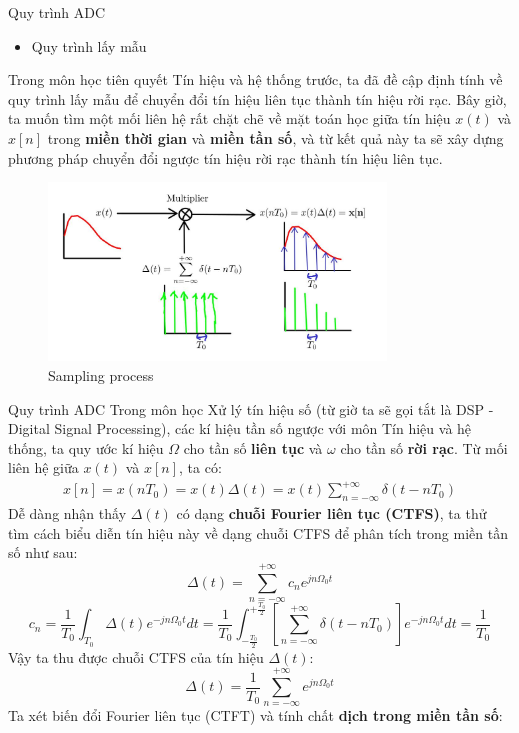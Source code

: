 \documentclass[8pt]{beamer}
\begin{document}
\begin{frame}{Quy trình ADC}
\begin{itemize}
	\item Quy trình lấy mẫu
\end{itemize}
Trong môn học tiên quyết \alert{Tín hiệu và hệ thống} trước, ta đã đề cập định tính về quy trình lấy mẫu để chuyển đổi tín hiệu liên tục thành tín hiệu rời rạc. Bây giờ, ta muốn tìm một mối liên hệ rất chặt chẽ về mặt toán học giữa tín hiệu $x(t)$ và $x[n]$ trong \textbf{miền thời gian} và \textbf{miền tần số}, và từ kết quả này ta sẽ xây dựng phương pháp chuyển đổi ngược tín hiệu rời rạc thành tín hiệu liên tục.
\begin{figure}[h]
			\includegraphics[width=0.8\textwidth]{3.jpg}
			\caption{Sampling process}			\label{fig:re4}
		\end{figure}

\end{frame}
\begin{frame}{Quy trình ADC}
	Trong môn học Xử lý tín hiệu số (từ giờ ta sẽ gọi tắt là DSP - Digital Signal Processing), các kí hiệu tần số \alert{ngược với môn Tín hiệu và hệ thống}, ta quy ước kí hiệu $\Omega$ cho tần số \textbf{liên tục} và $\omega$ cho tần số \textbf{rời rạc}. Từ mối liên hệ giữa $x(t)$ và $x[n]$, ta có:
\begin{equation*}
\begin{split}
	x[n]=x(nT_{0})=x(t)\Delta(t)=x(t)\sum_{n=-\infty}^{+\infty}\delta(t-nT_{0})
\end{split}
\end{equation*}
Dễ dàng nhận thấy $\Delta(t)$ có dạng \textbf{chuỗi Fourier liên tục (CTFS)}, ta thử tìm cách biểu diễn tín hiệu này về dạng chuỗi CTFS để phân tích trong miền tần số như sau:
$$\Delta(t)=\sum_{n=-\infty}^{+\infty}c_{n}e^{jn\Omega_{0}t}$$
$$c_{n}=\frac{1}{T_{0}}\int_{T_{0}}\Delta(t)e^{-jn\Omega_{0}t}dt=\frac{1}{T_{0}}\int_{-\frac{T_{0}}{2}}^{+\frac{T_{0}}{2}}\left[\sum_{n=-\infty}^{+\infty}\delta(t-nT_{0})\right]e^{-jn\Omega_{0}t}dt=\frac{1}{T_{0}}$$
Vậy ta thu được chuỗi CTFS của tín hiệu $\Delta(t)$: 
$$\Delta(t)=\frac{1}{T_{0}}\sum_{n=-\infty}^{+\infty}e^{jn\Omega_{0}t}$$
Ta xét biến đổi Fourier liên tục (CTFT) và tính chất \textbf{dịch trong miền tần số}:
\end{frame}
\end{document}
